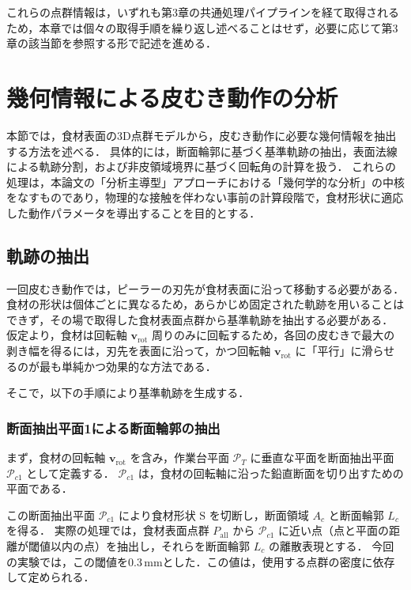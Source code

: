 これらの点群情報は，いずれも第3章の共通処理パイプラインを経て取得されるため，本章では個々の取得手順を繰り返し述べることはせず，必要に応じて第3章の該当節を参照する形で記述を進める．

\section{幾何情報による皮むき動作の分析}
\label{sec:peeling_phase_geo}

本節では，食材表面の3D点群モデルから，皮むき動作に必要な幾何情報を抽出する方法を述べる．
具体的には，断面輪郭に基づく基準軌跡の抽出，表面法線による軌跡分割，および非皮領域境界に基づく回転角の計算を扱う．
これらの処理は，本論文の「分析主導型」アプローチにおける「幾何学的な分析」の中核をなすものであり，物理的な接触を伴わない事前の計算段階で，食材形状に適応した動作パラメータを導出することを目的とする．

\subsection{軌跡の抽出}
\label{sec:peeling_trajectory}

一回皮むき動作では，ピーラーの刃先が食材表面に沿って移動する必要がある．
食材の形状は個体ごとに異なるため，あらかじめ固定された軌跡を用いることはできず，その場で取得した食材表面点群から基準軌跡を抽出する必要がある．
仮定より，食材は回転軸 $\mathbf{v}_{\mathrm{rot}}$ 周りのみに回転するため，各回の皮むきで最大の剥き幅を得るには，刃先を表面に沿って，かつ回転軸 $\mathbf{v}_{\mathrm{rot}}$ に「平行」に滑らせるのが最も単純かつ効果的な方法である．

そこで，以下の手順により基準軌跡を生成する．

\subsubsection{断面抽出平面1による断面輪郭の抽出}

まず，食材の回転軸 $\mathbf{v}_{\mathrm{rot}}$ を含み，作業台平面 $\mathcal{P}_T$ に垂直な平面を断面抽出平面 $\mathcal{P}_{c1}$ として定義する．
$\mathcal{P}_{c1}$ は，食材の回転軸に沿った鉛直断面を切り出すための平面である．

この断面抽出平面 $\mathcal{P}_{c1}$ により食材形状 $\mathrm{S}$ を切断し，断面領域 $A_c$ と断面輪郭 $L_c$ を得る．
実際の処理では，食材表面点群 $P_{\mathrm{all}}$ から $\mathcal{P}_{c1}$ に近い点（点と平面の距離が閾値以内の点）を抽出し，それらを断面輪郭 $L_c$ の離散表現とする．
今回の実験では，この閾値を0.3\,mmとした．この値は，使用する点群の密度に依存して定められる．

